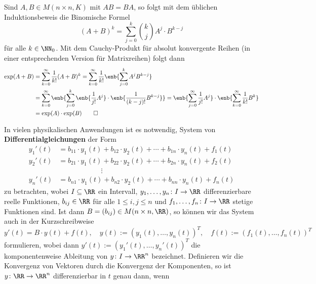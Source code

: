 \begin{beweis}[Skizze]
	Sind $A,B \in M(n \times n,K)$ mit $AB = BA$, so folgt mit dem üblichen Induktionsbeweis die Binomische Formel 
	\[
	(A+B)^{k} = \sum_{j=0}^{k} \binom{k}{j} A^{j} \cdot B^{k-j}
		\]
	für alle $k \in \NN_0$.
	Mit dem Cauchy-Produkt für absolut konvergente Reihen (in einer entsprechenden Version für Matrixreihen) folgt dann
	\begin{align*}
	\exp(A+B) &= \sum_{k=0}^{\infty} \frac{1}{k!} (A+B)^k = \sum_{k=0}^{\infty} \frac{1}{k!} \enb{\sum_{j=0}^{k} A^{j} B^{k-j}} \\
	&= \sum_{k=0}^{\infty} \enb{\sum_{j=0}^{k} \enb{\frac{1}{j!} A^{j}} \cdot \enb{\frac{1}{(k-j)!} B^{k-j}}} = \enb{\sum_{j=0}^{\infty} \frac{1}{j!} A^{j}} \cdot \enb{\sum_{k=0}^{\infty} \frac{1}{k!} B^{k}} \\
	&= \exp(A) \cdot \exp(B) \qedhere
	\end{align*}
\end{beweis}

In vielen physikalischen Anwendungen ist es notwendig, System von \textbf{Differentialgleichungen} der Form 
\begin{align*}
	y_1'(t) &= b_{11} \cdot y_1(t) + b_{12} \cdot y_2(t) + \cdots + b_{1n} \cdot y_n(t) + f_1 (t) \\
	y_2'(t) &= b_{21} \cdot y_1(t) + b_{22} \cdot y_2(t) + \cdots + b_{2n} \cdot y_n(t) + f_2 (t)\\
	& \qquad \qquad \qquad \vdots \\
	y_n'(t) &= b_{n1} \cdot y_1(t) + b_{n2} \cdot y_2(t) + \cdots + b_{nn} \cdot y_n(t) + f_n(t)
\end{align*}
zu betrachten, wobei $I \subseteq \RR$ ein Intervall, $y_1,\dots,y_n\colon I \rightarrow \RR$ differenzierbare reelle Funktionen, $b_{ij} \in \RR$ für alle $1 \leq i,j \leq n$ und $f_1,\dots,f_n \colon I \rightarrow \RR$ stetige Funktionen sind.
Ist dann $B = (b_{ij}) \in M(n \times n, \RR)$, so können wir das System auch in der Kurzschreibweise
\[
	y'(t) = B \cdot y(t) + f(t), \quad y(t) := (y_1(t),\dots,y_n(t))^T, \quad f(t) := (f_1(t),\dots,f_n(t))^T
\]
formulieren, wobei dann $y'(t) := (y_1'(t),\dots,y_n'(t))^T$ die komponentenweise Ableitung von $y\colon I \rightarrow \RR^n$ bezeichnet.
Definieren wir die Konvergenz von Vektoren durch die Konvergenz der Komponenten, so ist $y \colon \RR \rightarrow \RR^n$ differenzierbar in $t$ genau dann, wenn

